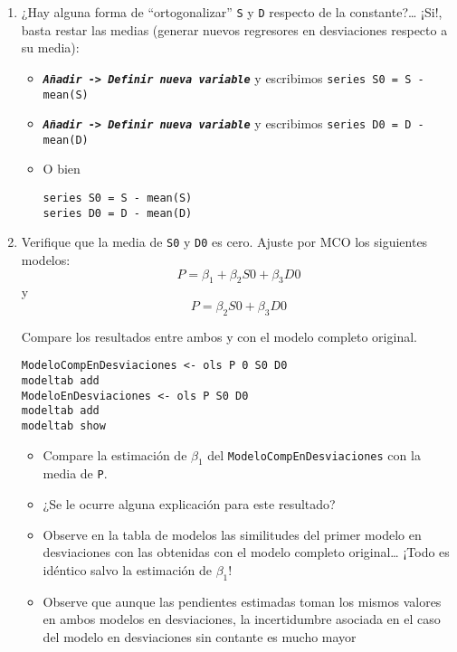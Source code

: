 \documentclass[11pt]{article}
\begin{document}
\begin{enumerate}
\item ¿Hay alguna forma de “ortogonalizar” \texttt{S} y \texttt{D} respecto de la
constante?\ldots{} ¡Si!, basta restar las medias (generar nuevos
regresores en desviaciones respecto a su media):

\begin{itemize}
\item \textbf{\emph{\texttt{Añadir -> Definir nueva variable}}} y escribimos \texttt{series S0 =
    S - mean(S)}
\item \textbf{\emph{\texttt{Añadir -> Definir nueva variable}}} y escribimos \texttt{series D0 =
    D - mean(D)}
\item O bien 
\begin{verbatim}
series S0 = S - mean(S)
series D0 = D - mean(D)
\end{verbatim}
\end{itemize}

\item Verifique que la media de \texttt{S0} y \texttt{D0} es cero. Ajuste por MCO los siguientes modelos:
\[P = \beta_1 + \beta_2 S0 + \beta_3 D0\]
y
\[P = \beta_2 S0 + \beta_3 D0\]

Compare los resultados entre ambos y con el modelo completo original.

\begin{verbatim}
ModeloCompEnDesviaciones <- ols P 0 S0 D0
modeltab add
ModeloEnDesviaciones <- ols P S0 D0
modeltab add
modeltab show
\end{verbatim}

\begin{itemize}
\item Compare la estimación de \(\beta_1\) del \texttt{ModeloCompEnDesviaciones}
con la media de \texttt{P}.

\item ¿Se le ocurre alguna explicación para este resultado?

\item Observe en la tabla de modelos las similitudes del primer modelo
en desviaciones con las obtenidas con el modelo completo
original\ldots{} ¡Todo es idéntico salvo la estimación de \(\beta_1\)!

\item Observe que aunque las pendientes estimadas toman los mismos
valores en ambos modelos en desviaciones, la incertidumbre
asociada en el caso del modelo en desviaciones sin contante es
mucho mayor
\end{itemize}
\end{enumerate}
\end{document}
